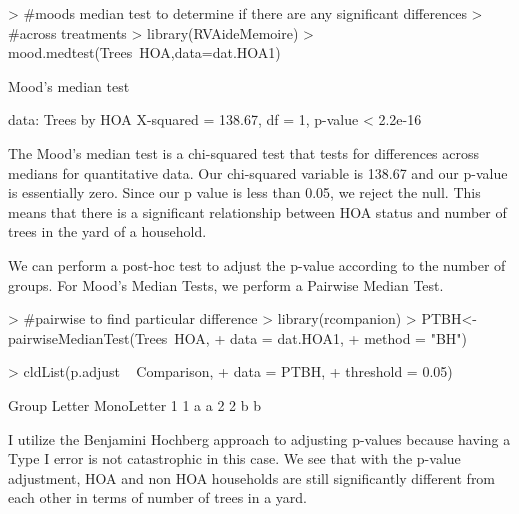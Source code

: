 \documentclass{article}
\begin{document}
\begin{Schunk}
\begin{Sinput}
> #moods median test to determine if there are any significant differences
> #across treatments
> library(RVAideMemoire)
> mood.medtest(Trees~HOA,data=dat.HOA1)
\end{Sinput}
\begin{Soutput}
	Mood's median test

data:  Trees by HOA
X-squared = 138.67, df = 1, p-value < 2.2e-16
\end{Soutput}
\end{Schunk}

The Mood's median test is a chi-squared test that tests for differences across medians for quantitative data. Our chi-squared variable is 138.67 and our p-value is essentially zero. Since our p value is less than 0.05, we reject the null. This means that there is a significant relationship between HOA status and number of trees in the yard of a household.

We can perform a post-hoc test to adjust the p-value according to the number of groups. For Mood's Median Tests, we perform a Pairwise Median Test. 

\begin{Schunk}
\begin{Sinput}
> #pairwise to find particular difference
> library(rcompanion)
> PTBH<-pairwiseMedianTest(Trees~HOA,
+                        data   = dat.HOA1,
+                        method = "BH")
\end{Sinput}
\end{Schunk}

\begin{Schunk}
\begin{Sinput}
> cldList(p.adjust ~ Comparison,
+         data = PTBH,
+         threshold = 0.05)
\end{Sinput}
\begin{Soutput}
  Group Letter MonoLetter
1     1      a         a 
2     2      b          b
\end{Soutput}
\end{Schunk}

I utilize the Benjamini Hochberg approach \citep{rcompanion} to adjusting p-values because having a Type I error is not catastrophic in this case. We see that with the p-value adjustment, HOA and non HOA households are still significantly different from each other in terms of number of trees in a yard.
\end{document}
